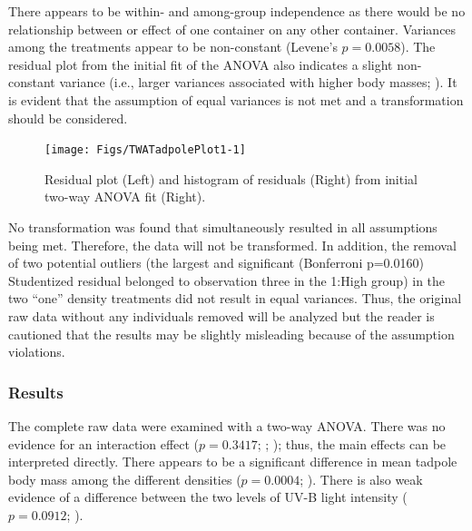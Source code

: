 \documentclass[10pt,openany]{book}\usepackage[]{graphicx}\usepackage[]{color}
\newenvironment{knitrout}{}{} %
\begin{document}
There appears to be within- and among-group independence as there would be no relationship between or effect of one container on any other container.  Variances among the treatments appear to be non-constant (Levene's  $p=0.0058$).  The residual plot from the initial fit of the ANOVA also indicates a slight non-constant variance (i.e., larger variances associated with higher body masses; ).  It is evident that the assumption of equal variances is not met and a transformation should be considered.

\begin{knitrout}
\color{fgcolor}\begin{figure}[h]

{\centering \texttt{[image: Figs/TWATadpolePlot1-1]} 

}

\caption[Residual plot (Left) and histogram of residuals (Right) from initial two-way ANOVA fit (Right)]{Residual plot (Left) and histogram of residuals (Right) from initial two-way ANOVA fit (Right).}\label{fig:TWATadpolePlot1}
\end{figure}


\end{knitrout}
\vspace{9pt}
No transformation was found that simultaneously resulted in all assumptions being met.  Therefore, the data will not be transformed.  In addition, the removal of two potential outliers (the largest and significant (Bonferroni p=0.0160) Studentized residual belonged to observation three in the 1:High group) in the two ``one'' density treatments  did not result in equal variances.  Thus, the original raw data without any individuals removed will be analyzed but the reader is cautioned that the results may be slightly misleading because of the assumption violations.

\subsubsection*{Results}
The complete raw data were examined with a two-way ANOVA.  There was no evidence for an interaction effect ($p=0.3417$; ; ); thus, the main effects can be interpreted directly.  There appears to be a significant difference in mean tadpole body mass among the different densities ($p=0.0004$; ).  There is also weak evidence of a difference between the two levels of UV-B light intensity ($p=0.0912$; ).
\end{document}
